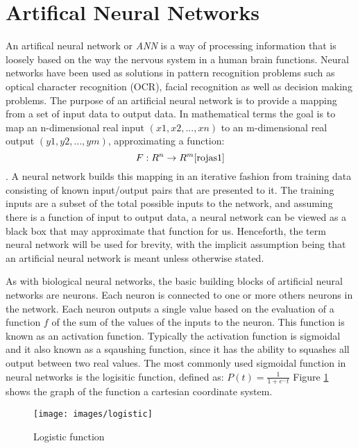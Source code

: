 \section{Artifical Neural Networks}
An artifical neural network or {\it ANN} is a way of processing
information that is loosely based on the way the nervous system in a
human brain functions.
Neural networks have been used as solutions in pattern recognition problems such as optical character recognition (OCR)\cite{ocr1,ocr2}, facial recognition\cite{face} as well as decision making problems\cite{decisionMaking1,decisionMaking2}.
The purpose of an artificial neural network is to provide a mapping from a set of input data to output data. 
In mathematical terms the goal is to map an n-dimensional real input
$(x1,x2,...,xn)$ to an m-dimensional real output $(y1,y2,...,ym)$, 
approximating a function: \begin{displaymath} F : R^n \rightarrow R^m \cite{rojas1}\end{displaymath}. 
A neural network builds this mapping in an iterative fashion from training data consisting of known input/output pairs that are presented to it. 
The training inputs are a subset of the total possible inputs to the network, and assuming there is a function of input to output data, a neural network can be viewed as a black box that may approximate that function for us.
Henceforth, the term neural network will be used for brevity, with the implicit assumption being that an artificial neural network is meant unless otherwise stated.

As with biological neural networks, the basic building blocks of artificial neural networks are neurons. 
Each neuron is connected to one or more others neurons in the network. 
Each neuron outputs a single value based on the evaluation of a function $f$ of the sum of the values of the inputs to the neuron.
This function is known as an activation function.
Typically the activation function is sigmoidal and it also known as a sqaushing function, since it has the ability to squashes all output between two real values\cite{mitchell1997}.
The most commonly used sigmoidal function in neural networks is the logisitic function, defined as:
$P(t) = \frac{1}{1 + e^-t}$
Figure \ref{logistic} shows the graph of the function a cartesian coordinate system.

\begin{figure}[h!]
  \centering
  \texttt{[image: images/logistic]}
  \caption{Logistic function}
  \label{logistic}
\end{figure}

